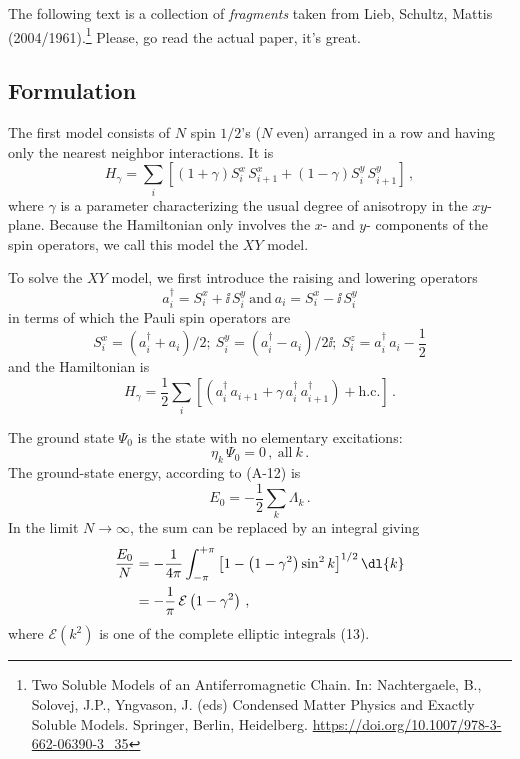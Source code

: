 The following text is a collection of \emph{fragments} taken from Lieb,
Schultz, Mattis (2004/1961).\footnote{Two Soluble Models of an
  Antiferromagnetic Chain. In: Nachtergaele, B., Solovej, J.P.,
  Yngvason, J. (eds) Condensed Matter Physics and Exactly Soluble
  Models. Springer, Berlin, Heidelberg.
  \url{https://doi.org/10.1007/978-3-662-06390-3_35}} Please, go read
the actual paper, it's great.

\subsection{Formulation}\label{formulation}

The first model consists of \(N\) spin \(1/2\)'s (\(N\) even) arranged
in a row and having only the nearest neighbor interactions. It is
\[H_{\gamma} = \sum_{i} \left[ \left( 1 + \gamma\right) S_i^x \, S_{i + 1}^x + \left(1 - \gamma\right) S_i^y \, S_{i + 1}^y \right] \,,\]
where \(\gamma\) is a parameter characterizing the usual degree of
anisotropy in the \(xy\)-plane. Because the Hamiltonian only involves
the \(x\)- and \(y\)- components of the spin operators, we call this
model the \(XY\) model.

To solve the \(XY\) model, we first introduce the raising and lowering
operators
\[a_i^\dagger = S_i^x + \ii \, S_i^y \ \text{and} \ a_i = S_i^x - \ii \, S_i^y\]
in terms of which the Pauli spin operators are
\[S_i^x = \left(a_i^\dagger + a_i\right) / 2; \ S_i^y = \left(a_i^\dagger - a_i\right) / 2 \ii; \ S_i^z = a_i^\dagger \, a_i - \frac{1}{2}\]
and the Hamiltonian is
\[H_\gamma = \frac{1}{2} \sum_i \left[ \left(a_i^\dagger \, a_{i + 1} + \gamma \, a_i^\dagger \, a_{i + 1}^\dagger\right) + \mathrm{h.c.}\right] \,.\]

The ground state \(\Psi_0\) is the state with no elementary excitations:
\[\eta_k \, \Psi_0 = 0\,, \ \text{all} \ k \,.\] The ground-state
energy, according to (A-12) is
\[E_0 = -\frac{1}{2} \sum_k \Lambda_k \,.\] In the limit
\(N \rightarrow \infty\), the sum can be replaced by an integral giving
\[\begin{aligned}
    \frac{E_0}{N} &= -\frac{1}{4 \pi} \int_{-\pi}^{+\pi} \left[1 - \left(1 - \gamma^2\right) \sin^2{k}\right]^{1/2} \dl{k} \\
    &= -\frac{1}{\pi} \, \mathcal{E}\left(1 - \gamma^2\right) \,,
\end{aligned}\] where \(\mathcal{E}\left(k^2\right)\) is one of the
complete elliptic integrals (13).
